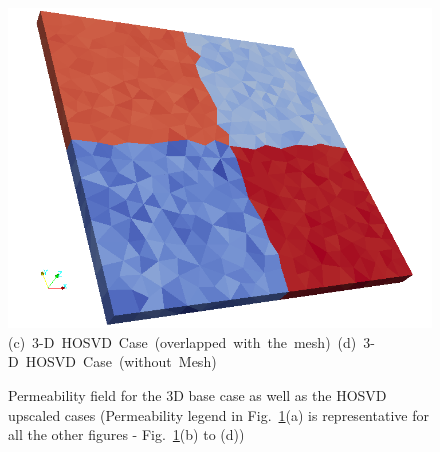\begin{landscape}
\begin{figure}[ht]
{{      \includegraphics[width=.7\textwidth]{./Pics/3D_HOSVDCase/3D_HOSVDCase_PermField_withoutMesh.png}}
\vspace{0.cm}
\hbox{(c) 3-D HOSVD Case (overlapped with the mesh) \hspace{4.75cm} (d) 3-D HOSVD Case (without Mesh)}
\vspace{0.cm}
}   
\caption{Permeability field for the 3D base case as well as the HOSVD upscaled cases (Permeability legend in Fig.~\ref{fig:3D_PermFields}(a) is representative for all the other figures - \ie Fig.~\ref{fig:3D_PermFields}(b) to (d))}
\label{fig:3D_PermFields}
\end{figure}
\end{landscape}
\clearpage

